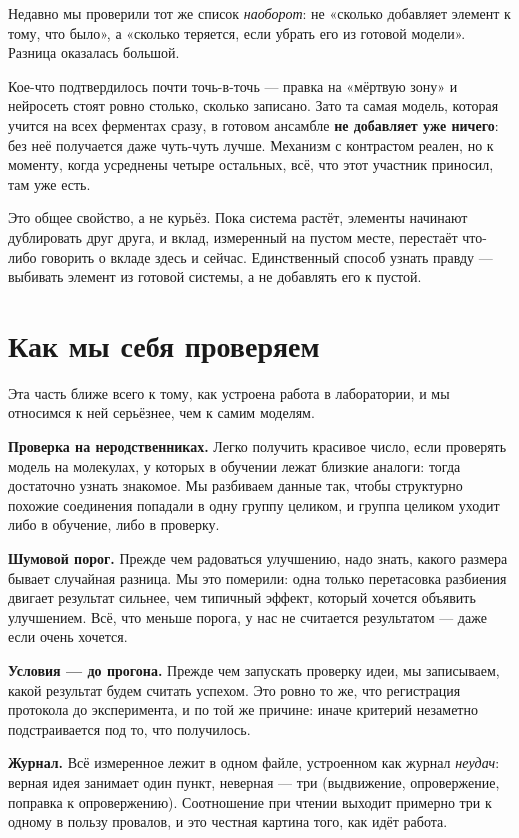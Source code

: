 \documentclass[11pt,a4paper]{article}
\begin{document}
Недавно мы проверили тот же список \emph{наоборот}: не «сколько добавляет элемент к тому, что
было», а «сколько теряется, если убрать его из готовой модели». Разница оказалась большой.

Кое-что подтвердилось почти точь-в-точь --- правка на «мёртвую зону» и нейросеть стоят ровно
столько, сколько записано. Зато та самая модель, которая учится на всех ферментах сразу,
в готовом ансамбле \textbf{не добавляет уже ничего}: без неё получается даже чуть-чуть лучше.
Механизм с контрастом реален, но к моменту, когда усреднены четыре остальных, всё, что этот
участник приносил, там уже есть.

Это общее свойство, а не курьёз. Пока система растёт, элементы начинают дублировать друг
друга, и вклад, измеренный на пустом месте, перестаёт что-либо говорить о вкладе здесь и
сейчас. Единственный способ узнать правду --- выбивать элемент из готовой системы, а не
добавлять его к пустой.

\section{Как мы себя проверяем}

Эта часть ближе всего к тому, как устроена работа в лаборатории, и мы относимся к ней
серьёзнее, чем к самим моделям.

\textbf{Проверка на неродственниках.} Легко получить красивое число, если проверять модель на
молекулах, у которых в обучении лежат близкие аналоги: тогда достаточно узнать знакомое.
Мы разбиваем данные так, чтобы структурно похожие соединения попадали в одну группу целиком,
и группа целиком уходит либо в обучение, либо в проверку.

\textbf{Шумовой порог.} Прежде чем радоваться улучшению, надо знать, какого размера бывает
случайная разница. Мы это померили: одна только перетасовка разбиения двигает результат
сильнее, чем типичный эффект, который хочется объявить улучшением. Всё, что меньше порога,
у нас не считается результатом --- даже если очень хочется.

\textbf{Условия --- до прогона.} Прежде чем запускать проверку идеи, мы записываем, какой
результат будем считать успехом. Это ровно то же, что регистрация протокола до эксперимента,
и по той же причине: иначе критерий незаметно подстраивается под то, что получилось.

\textbf{Журнал.} Всё измеренное лежит в одном файле, устроенном как журнал \emph{неудач}:
верная идея занимает один пункт, неверная --- три (выдвижение, опровержение, поправка к
опровержению). Соотношение при чтении выходит примерно три к одному в пользу провалов, и это
честная картина того, как идёт работа.
\end{document}
